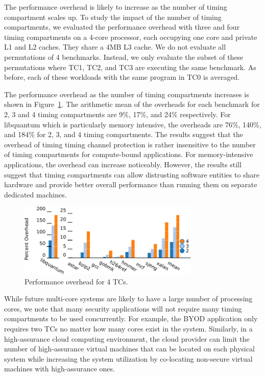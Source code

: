 The performance overhead is likely to increase as the number of timing 
compartment scales up. To study the impact of the number of timing 
compartments, we evaluated the performance overhead with three and four timing 
compartments on a 4-core  processor, each occupying one core and private L1 and 
L2 caches. They share a 4MB L3 cache. We do not evaluate all permutations of 4 
benchmarks. Instead, we only evaluate the subset of these permutations where 
TC1, TC2, and TC3 are executing the same benchmark. As before, each of these 
workloads with the same program in TC0 is averaged.

The performance overhead as the number of timing compartments increases is 
shown in Figure~\ref{fig:scalability}. The arithmetic mean of the overheads for 
each benchmark for 2, 3 and 4 timing compartments are 9\%, 17\%, and 24\% 
respectively. For libquantum which is particularly memory intensive, the 
overheads are 76\%, 140\%, and 184\% for 2, 3, and 4 timing compartments. The 
results suggest that the overhead of timing timing channel protection is rather 
insensitive to the number of timing compartments for compute-bound 
applications. For memory-intensive applications, the overhead can increase 
noticeably. However, the results still suggest that timing compartments can 
allow distrusting software entities to share hardware and provide better 
overall performance than running them on separate dedicated machines.

\begin{figure}
    \begin{center}
        \includegraphics[width=3.4in]{figs/scalability_split.pdf}
        \caption{Performance overhead for 4 TCs.}
        \label{fig:scalability}
    \end{center}
\end{figure}

While future multi-core systems are likely to have a large number of processing 
cores, we note that many security applications will not require many timing 
compartments to be used concurrently. For example, the BYOD application only 
requires two TCs no matter how many cores exist in the system. Similarly, in 
a high-assurance cloud computing environment, the cloud provider can limit the
number of high-assurance virtual machines that can be located on each physical
system while increasing the system utilization by co-locating non-secure
virtual machines with high-assurance ones.

